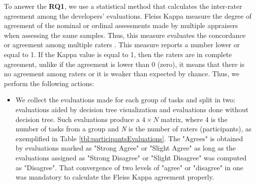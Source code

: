 To answer the \textbf{RQ1}, we use a statistical method that calculates the inter-rater agreement among the developers’ evaluations. Fleiss Kappa \cite{fleiss1971measuring} measure the degree of agreement of the nominal or ordinal assessments made by multiple appraisers when assessing the same samples. Thus, this measure evaluates the concordance or agreement among multiple raters \cite{fleiss1971measuring}. This measure reports a number lower or equal to 1. If the Kappa value is equal to 1, then the raters are in complete agreement, unlike if the agreement is lower than 0 (zero), it means that there is no agreement among raters or it is weaker than expected by chance. Thus, we perform the following actions:
\begin{itemize}
    \item We collect the evaluations made for each group of tasks and split in two: evaluations aided by decision tree visualization and evaluations done without decision tree. Such evaluations produce a $4 \times N$ matrix, where 4 is the number of tasks from a group and \textit{N} is the number of raters (participants), as exemplified in Table \ref{tbl:participantsEvaluations}. The "Agrees" is obtained by evaluations marked as "Strong Agree" or "Slight Agree" as long as the evaluations assigned as "Strong Disagree" or "Slight Disagree" was computed as "Disagree". That convergence of two levels of "agree" or "disagree" in one was mandatory to calculate the Fleiss Kappa agreement properly. %
    

\end{itemize}
